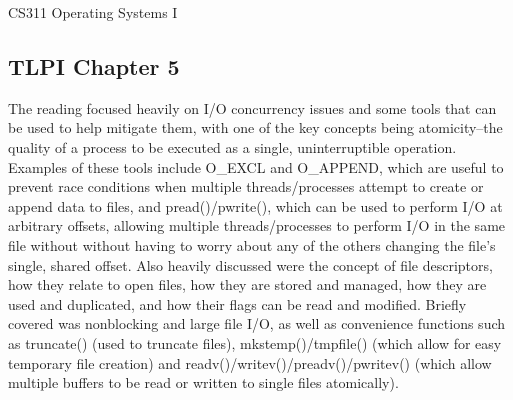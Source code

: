 \documentclass[letterpaper,10pt,fleqn]{article}
\numberwithin{equation}{section}
\begin{document}



{\Large CS311 Operating Systems I}

\subsection*{TLPI Chapter 5}

The reading focused heavily on I/O concurrency issues and some tools that can be used to help mitigate them, with one of the key concepts being atomicity--the quality of a process to be executed as a single, uninterruptible operation.  Examples of these tools include O\_EXCL and O\_APPEND, which are useful to prevent race conditions when multiple threads/processes attempt to create or append data to files, and pread()/pwrite(), which can be used to perform I/O at arbitrary offsets, allowing multiple threads/processes to perform I/O in the same file without without having to worry about any of the others changing the file's single, shared offset.  Also heavily discussed were the concept of file descriptors, how they relate to open files, how they are stored and managed, how they are used and duplicated, and how their flags can be read and modified.  Briefly covered was nonblocking and large file I/O, as well as convenience functions such as truncate() (used to truncate files), mkstemp()/tmpfile() (which allow for easy temporary file creation) and readv()/writev()/preadv()/pwritev() (which allow multiple buffers to be read or written to single files atomically).
\end{document}
